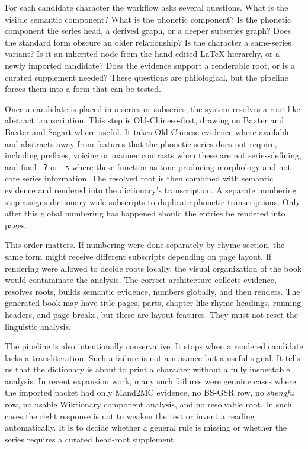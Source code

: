 For each candidate character the workflow asks several questions. What is the visible semantic component? What is the phonetic component? Is the phonetic component the series head, a derived graph, or a deeper subseries graph? Does the standard form obscure an older relationship? Is the character a same-series variant? Is it an inherited node from the hand-edited LaTeX hierarchy, or a newly imported candidate? Does the evidence support a renderable root, or is a curated supplement needed? These questions are philological, but the pipeline forces them into a form that can be tested.

Once a candidate is placed in a series or subseries, the system resolves a root-like abstract transcription. This step is Old-Chinese-first, drawing on Baxter \parencite{baxter-1992} and Baxter and Sagart \parencite{baxter-sagart-2014} where useful. It takes Old Chinese evidence where available and abstracts away from features that the phonetic series does not require, including prefixes, voicing or manner contrasts when these are not series-defining, and final \texttt{-ʔ} or \texttt{-s} where these function as tone-producing morphology and not core series information. The resolved root is then combined with semantic evidence and rendered into the dictionary's transcription. A separate numbering step assigns dictionary-wide subscripts to duplicate phonetic transcriptions. Only after this global numbering has happened should the entries be rendered into pages.

This order matters. If numbering were done separately by rhyme section, the same form might receive different subscripts depending on page layout. If rendering were allowed to decide roots locally, the visual organization of the book would contaminate the analysis. The correct architecture collects evidence, resolves roots, builds semantic evidence, numbers globally, and then renders. The generated book may have title pages, parts, chapter-like rhyme headings, running headers, and page breaks, but these are layout features. They must not reset the linguistic analysis.

The pipeline is also intentionally conservative. It stops when a rendered candidate lacks a transliteration. Such a failure is not a nuisance but a useful signal. It tells us that the dictionary is about to print a character without a fully inspectable analysis. In recent expansion work, many such failures were genuine cases where the imported packet had only Mand2MC evidence, no BS-GSR row, no \emph{shengfu} row, no usable Wiktionary component analysis, and no resolvable root. In such cases the right response is not to weaken the test or invent a reading automatically. It is to decide whether a general rule is missing or whether the series requires a curated head-root supplement.

